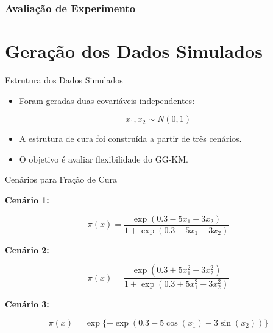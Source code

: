\documentclass[aspectratio=169,t,xcolor=table]{beamer}
\begin{document}
\begin{frame}
\frametitle{Avaliação de Experimento}
\end{frame}

\section{Geração dos Dados Simulados}

\begin{frame}{Estrutura dos Dados Simulados}

\begin{itemize}
\item Foram geradas duas covariáveis independentes:
\end{itemize}

\[
x_1,x_2 \sim N(0,1)
\]

\vspace{0.4cm}

\begin{itemize}
\item A estrutura de cura foi construída a partir de três cenários.

\vspace{0.3cm}

\item O objetivo é avaliar flexibilidade do GG-KM.

\end{itemize}

\end{frame}

\begin{frame}{Cenários para Fração de Cura}

\textbf{Cenário 1:}

\[
\pi(x)=
\frac{\exp(0.3-5x_1-3x_2)}
{1+\exp(0.3-5x_1-3x_2)}
\]

\vspace{0.3cm}

\textbf{Cenário 2:}

\[
\pi(x)=
\frac{\exp(0.3+5x_1^2-3x_2^2)}
{1+\exp(0.3+5x_1^2-3x_2^2)}
\]

\vspace{0.3cm}

\textbf{Cenário 3:}

\[
\pi(x)=
\exp\{-\exp(0.3-5\cos(x_1)-3\sin(x_2))\}
\]

\end{frame}
\end{document}
